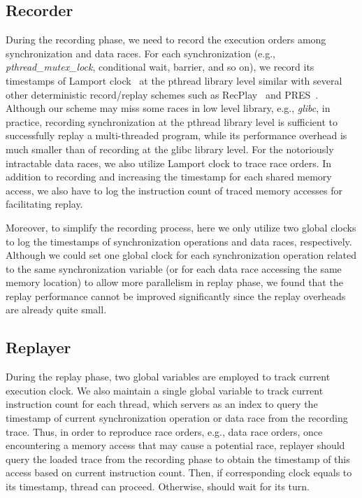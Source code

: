 \documentclass[10pt,onecolumn,letterpaper]{article}
\begin{document}
\subsection{Recorder}
During the recording phase, we need to record the execution orders
among synchronization and data races. For each synchronization
(e.g., \emph{pthread\_mutex\_lock}, conditional wait, barrier, and
so on), we record its timestamps of Lamport
clock~\cite{Lamport78CACM} at the pthread library level similar with
several other deterministic record/replay schemes such as
RecPlay~\cite{Ronsse99TCS} and PRES~\cite{Park09SOSP}. Although our
scheme may miss some races in low level library, e.g., \emph{glibc},
in practice, recording synchronization at the pthread library level
is sufficient to successfully replay a multi-threaded program, while
its performance overhead is much smaller than of recording at the
glibc library level. For the notoriously intractable data races, we
also utilize Lamport clock to trace race orders. In addition to
recording and increasing the timestamp for each shared memory
access, we also have to log the instruction count of traced memory
accesses for facilitating replay.

Moreover, to simplify the recording process, here we only utilize
two global clocks to log the timestamps of synchronization
operations and data races, respectively. Although we could set one
global clock for each synchronization operation related to the same
synchronization variable (or for each data race accessing the same
memory location) to allow more parallelism in replay phase, we found
that the replay performance cannot be improved significantly since
the replay overheads are already quite small.


\subsection{Replayer}


During the replay phase, two global variables are employed to track
current execution clock. We also maintain a single global variable
to track current instruction count for each thread, which servers as
an index to query the timestamp of current synchronization operation
or data race from the recording trace. Thus, in order to reproduce
race orders, e.g., data race orders, once encountering a memory
access that may cause a potential race, replayer should query the
loaded trace from the recording phase to obtain the timestamp of
this access based on current instruction count. Then, if
corresponding clock equals to its timestamp, thread  can proceed.
Otherwise,  should wait for its turn.
\end{document}
